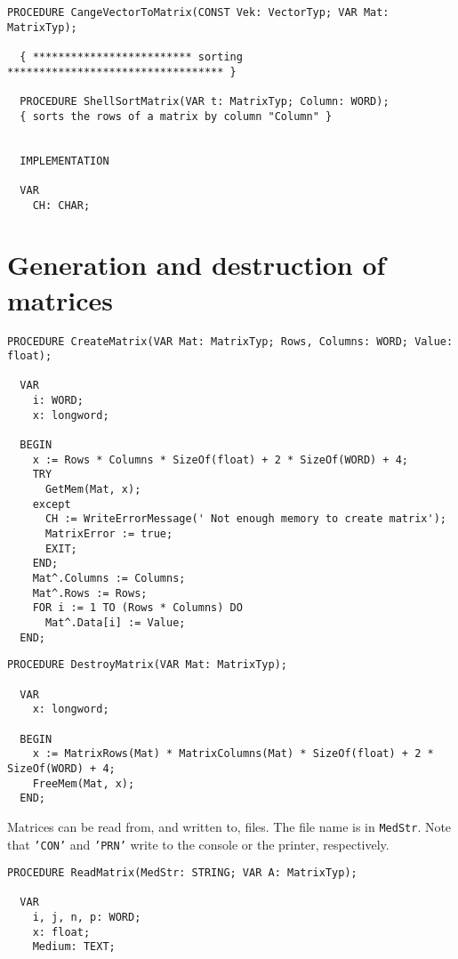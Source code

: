 \begin{refsection}
\begin{lstlisting}[caption=Interface of unit Matrix]
  PROCEDURE CangeVectorToMatrix(CONST Vek: VectorTyp; VAR Mat: MatrixTyp);

  { ************************* sorting ********************************** }

  PROCEDURE ShellSortMatrix(VAR t: MatrixTyp; Column: WORD);
  { sorts the rows of a matrix by column "Column" }


  IMPLEMENTATION

  VAR
    CH: CHAR;
\end{lstlisting}

\section{Generation and destruction of matrices}


\begin{lstlisting}[caption=Create a new matrix]
  PROCEDURE CreateMatrix(VAR Mat: MatrixTyp; Rows, Columns: WORD; Value: float);

  VAR
    i: WORD;
    x: longword;

  BEGIN
    x := Rows * Columns * SizeOf(float) + 2 * SizeOf(WORD) + 4;
    TRY
      GetMem(Mat, x);
    except
      CH := WriteErrorMessage(' Not enough memory to create matrix');
      MatrixError := true;
      EXIT;
    END;
    Mat^.Columns := Columns;
    Mat^.Rows := Rows;
    FOR i := 1 TO (Rows * Columns) DO
      Mat^.Data[i] := Value;
  END;
\end{lstlisting}


\begin{lstlisting}[caption=Remove a matrix and free its memory]
  PROCEDURE DestroyMatrix(VAR Mat: MatrixTyp);

  VAR
    x: longword;

  BEGIN
    x := MatrixRows(Mat) * MatrixColumns(Mat) * SizeOf(float) + 2 * SizeOf(WORD) + 4;
    FreeMem(Mat, x);
  END;
\end{lstlisting}

Matrices can be read from, and written to, files. The file name is in \texttt{MedStr}. Note that \texttt{'CON'} and \texttt{'PRN'} write to the console or the printer, respectively.

\begin{lstlisting}[caption=Read a matrix from file]
  PROCEDURE ReadMatrix(MedStr: STRING; VAR A: MatrixTyp);

  VAR
    i, j, n, p: WORD;
    x: float;
    Medium: TEXT;


\end{lstlisting}
\end{refsection}
